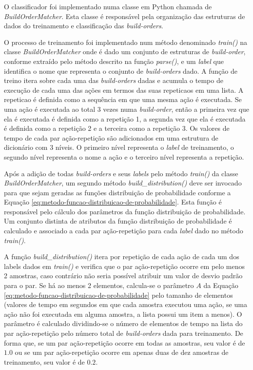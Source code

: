 O classificador foi implementado numa classe em Python chamada de \textit{BuildOrderMatcher}. Esta classe é responsável pela organização das estruturas de dados do treinamento e classificação das \textit{\glspl{build-order}}.

O processo de treinamento foi implementado num método denominado \textit{train()} na classe \textit{BuildOrderMatcher} onde é dado um conjunto de estruturas de \textit{\gls{build-order}}, conforme extraído pelo método descrito na função \textit{parse()}, e um \textit{label} que identifica o nome que representa o conjunto de \textit{\glspl{build-order}} dado. A função de treino itera sobre cada uma das \textit{\glspl{build-order}} dadas e acumula o tempo de execução de cada uma das ações em termos das suas \glspl{repeticao} em uma lista. A \gls{repeticao} é definida como a sequência em que uma mesma ação é executada. Se uma ação é executada ao total 3 vezes numa \textit{\gls{build-order}}, então a primeira vez que ela é executada é definida como a repetição 1, a segunda vez que ela é executada é definida como a repetição 2 e a terceira como a repetição 3. Os valores de tempo de cada par ação-repetição são adicionados em uma estrutura de dicionário com 3 níveis. O primeiro nível representa o \textit{label} de treinamento, o segundo nível representa o nome a ação e o terceiro nível representa a repetição.

Após a adição de todas \textit{\glspl{build-order}} e seus \textit{labels} pelo método \textit{train()} da classe \textit{BuildOrderMatcher}, um segundo método \textit{build\_distribution()} deve ser invocado para que sejam geradas as funções distribuição de probabilidade conforme a Equação \ref{eq:metodo-funcao-distribuicao-de-probabilidade}. Esta função é responsável pelo cálculo dos parâmetros da função distribuição de probabilidade. Um conjunto distinta de atributos da função distribuição de probabilidade é calculado e associado a cada par ação-repetição para cada \textit{label} dado no método \textit{train()}.

A função \textit{build\_distribution()} itera por repetição de cada ação de cada um dos labels dados em \textit{train()} e verifica que o par ação-repetição ocorre em pelo menos 2 amostras, caso contrário não seria possível atribuir um valor de desvio padrão para o par. Se há ao menos 2 elementos, calcula-se o parâmetro $A$ da Equação \ref{eq:metodo-funcao-distribuicao-de-probabilidade} pelo tamanho de elementos (valores de tempo em segundos em que cada amostra executou uma ação, se uma ação não foi executada em alguma amostra, a lista possui um item a menos). O parâmetro é calculado dividindo-se o número de elementos de tempo na lista do par ação-repetição pelo número total de \textit{\glspl{build-order}} dada para treinamento. De forma que, se um par ação-repetição ocorre em todas as amostras, seu valor é de $1.0$ ou se um par ação-repetição ocorre em apenas duas de dez amostras de treinamento, seu valor é de $0.2$.

